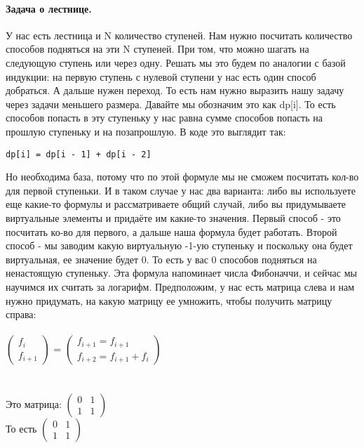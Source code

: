 \documentclass[a4paper,12pt]{article}
\begin{document}
\paragraph{Задача о лестнице.}
У нас есть лестница и N количество ступеней. Нам нужно посчитать количество способов подняться на эти N ступеней. При том, что можно шагать на следующую ступень или через одну. Решать мы это будем по аналогии с базой индукции: на первую ступень с нулевой ступени у нас есть один способ добраться. А дальше нужен переход. То есть нам нужно выразить нашу задачу через задачи меньшего размера. Давайте мы обозначим это как dp[i]. То есть способов попасть в эту ступеньку у нас равна сумме способов попасть на прошлую ступеньку и на позапрошлую. В коде это выглядит так:
\begin{verbatim}
dp[i] = dp[i - 1] + dp[i - 2]
\end{verbatim}
Но необходима база, потому что по этой формуле мы не сможем посчитать кол-во для первой ступеньки. И в таком случае у нас два варианта: либо вы используете еще какие-то формулы и рассматриваете общий случай, либо вы придумываете виртуальные элементы и придаёте им какие-то значения. Первый способ - это посчитать ко-во для первого, а дальше наша формула будет работать. Второй способ  - мы заводим какую виртуальную -1-ую ступеньку и поскольку она будет виртуальная, ее значение будет 0. То есть у вас 0 способов подняться на ненастоящую ступеньку. Эта формула напоминает числа Фибоначчи, и сейчас мы научимся их считать за логарифм. Предположим, у нас есть матрица слева и нам нужно придумать, на какую матрицу ее умножить, чтобы получить матрицу справа:\\ \\
 $\begin{pmatrix}
  f_i\\ 
  f_{i+1}
\end{pmatrix}$
=
 $\begin{pmatrix}
  f_{i+1} = f_{i+1}\\
  f_{i+2} = f_{i+1} + f_i
\end{pmatrix}$\\
\\ \\ Это матрица:
 $\begin{pmatrix}
  0 & 1\\ 
  1 & 1
\end{pmatrix}$ \\
То есть 
$\begin{pmatrix}
  0 & 1\\ 
  1 & 1
\end{pmatrix}$ 
\end{document}
